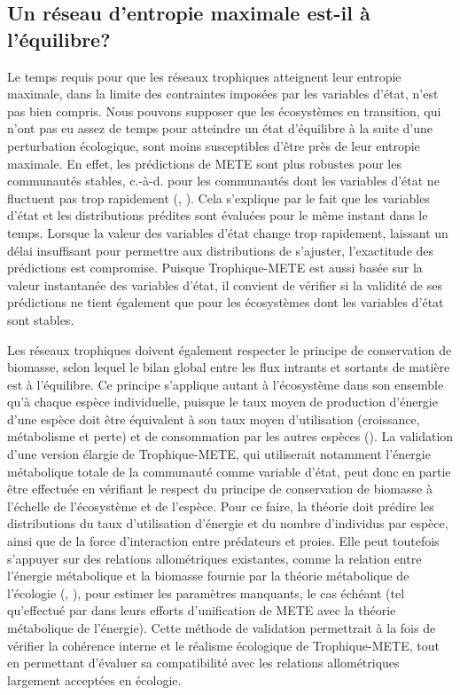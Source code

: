 \subsection{Un réseau d'entropie maximale est-il à l'équilibre?} 

Le temps requis pour que les réseaux trophiques atteignent leur entropie
maximale, dans la limite des contraintes imposées par les variables d'état,
n'est pas bien compris. Nous pouvons supposer que les écosystèmes en transition,
qui n'ont pas eu assez de temps pour atteindre un état d'équilibre à la suite
d'une perturbation écologique, sont moins susceptibles d'être près de leur
entropie maximale. En effet, les prédictions de METE sont plus robustes pour les
communautés stables, c.-à-d. pour les communautés dont les variables d'état ne
fluctuent pas trop rapidement (\cite{Newman2020Disturbance},
\cite{Harte2021Dynamete}). Cela s'explique par le fait que les variables d'état
et les distributions prédites sont évaluées pour le même instant dans le temps.
Lorsque la valeur des variables d'état change trop rapidement, laissant un délai
insuffisant pour permettre aux distributions de s'ajuster, l'exactitude des
prédictions est compromise. Puisque Trophique-METE est aussi basée sur la valeur
instantanée des variables d'état, il convient de vérifier si la validité de ses
prédictions ne tient également que pour les écosystèmes dont les variables
d'état sont stables.

Les réseaux trophiques doivent également respecter le principe de conservation
de biomasse, selon lequel le bilan global entre les flux intrants et sortants de
matière est à l'équilibre. Ce principe s'applique autant à l'écosystème dans son
ensemble qu'à chaque espèce individuelle, puisque le taux moyen de production
d'énergie d'une espèce doit être équivalent à son taux moyen d'utilisation
(croissance, métabolisme et perte) et de consommation par les autres espèces
(\cite{Sterner2002Ecological}). La validation d'une version élargie de
Trophique-METE, qui utiliserait notamment l'énergie métabolique totale de la
communauté comme variable d'état, peut donc en partie être effectuée en
vérifiant le respect du principe de conservation de biomasse à l'échelle de
l'écosystème et de l'espèce. Pour ce faire, la théorie doit prédire les
distributions du taux d'utilisation d'énergie et du nombre d'individus par
espèce, ainsi que de la force d'interaction entre prédateurs et proies. Elle
peut toutefois s'appuyer sur des relations allométriques existantes, comme la
relation entre l'énergie métabolique et la biomasse fournie par la théorie
métabolique de l'écologie (\cite{Brown2004Metabolic}, \cite{West1997General}),
pour estimer les paramètres manquants, le cas échéant (tel qu'effectué par
\cite{Harte2022Equation} dans leurs efforts d'unification de METE avec la
théorie métabolique de l'énergie). Cette méthode de validation permettrait à la
fois de vérifier la cohérence interne et le réalisme écologique de
Trophique-METE, tout en permettant d'évaluer sa compatibilité avec les relations
allométriques largement acceptées en écologie.


